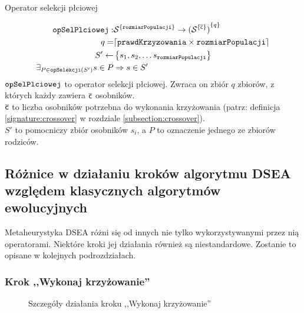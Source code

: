\documentclass[./FM_mgr.tex]{subfiles}
\begin{document}
\begin{signature}
	\caption{Operator selekcji płciowej \label{signature:genSel}}
	\begin{align}
	\mathtt{opSelPlciowej}: &{ \mathcal{S}}^{ \{ \mathtt{rozmiarPopulacji}  \}} \rightarrow { ( {\mathcal{S}  }^{ \{ \mathsf{\overline{c}} \}} ) }^{ \{ q \}} \\
	q = & \lceil \mathtt{prawdKrzyzowania} \times \mathtt{rozmiarPopulacji} \rceil \\
	S' \gets &\left\{ s_1, s_2, \ldots s_{\mathtt{rozmiarPopulacji}} \right\} \\
	\exists_{P \in \mathtt{opSelekcji}(S')} s \in P &\Rightarrow s \in S'\\
	\end{align}	
	$\mathtt{opSelPlciowej}$ to operator selekcji płciowej.
	Zwraca on zbiór $q$ zbiorów, z których każdy zawiera $\mathsf{\overline{c}}$ osobników. \\
	$\mathsf{\overline{c}}$ to liczba osobników potrzebna do wykonania krzyżowania (patrz: definicja \ref{signature:crossover} w rozdziale \ref{subsection:crossover}). \\
	$S'$ to pomocniczy zbiór osobników $s_i$, a $P$ to oznaczenie jednego ze zbiorów rodziców.
\end{signature}

\subsection{Różnice w działaniu kroków algorytmu DSEA względem klasycznych algorytmów ewolucyjnych}

Metaheurystyka DSEA różni się od innych nie tylko wykorzystywanymi przez nią operatorami.
Niektóre kroki jej działania również są niestandardowe.
Zostanie to opisane w kolejnych podrozdziałach.

\subsubsection{Krok ,,Wykonaj krzyżowanie''} \label{subsubsection:my_crossover}

\begin{figure}[H]
	\caption{Szczegóły działania kroku ,,Wykonaj krzyżowanie'' \label{figure:my_crossover}}
\end{figure}
\end{document}
